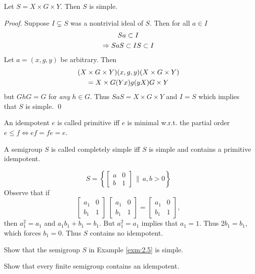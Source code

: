 \begin{proposition}  	\label{prop:2.1}
Let $S = X \times G \times Y$.  
Then $S$ is simple.
\end{proposition}

\begin{proof}  Suppose $I \subsetneq S$ was a nontrivial ideal of
$S$.  Then for all $a \in I$
\[
     \gathered
     Sa \subset I                                       \\
     \Rightarrow Sa S \subset IS \subset I
     \endgathered
\]
Let $a = (x,g,y)$ be arbitrary.  Then
\[
     \gathered
     (X \times G \times Y)(x,g,y)(X \times G \times Y)                  \\
     = X \times G(Yx)g(yX)G \times Y
     \endgathered
\]
but $GhG = G$ for {\it any} $h \in G$.  Thus $SaS = X \times G \times Y$ and
$I = S$ which implies that $S$ is simple.
\qed
\end{proof}

\begin{definition} 	\label{defn:2.4}
An idempotent $e$ is called primitive iff $e$ is minimal w.r.t. the partial order $e \le f \Leftrightarrow ef = fe = e$.
\end{definition}

\begin{definition} 	\label{defn:2.5}
A semigroup $S$ is called completely simple iff $S$ is simple and contains a primitive idempotent.
\end{definition}

\begin{example}		\label{exm:2.5}  
\[
     S = \left\{ \begin{bmatrix}  a &0 \\ b &1 \end{bmatrix}
          \,\bigg\|\, a,b > 0 \right\}                 
\]
Observe that if 
\[
        \begin{bmatrix}  a_1 &0 \\ b_1 &1 \end{bmatrix} \
        \begin{bmatrix} a_1 &0  \\ b_1 &1 \end{bmatrix} =
        \begin{bmatrix} a_1 &0  \\ b_1 &1 \end{bmatrix},    
\]
then $a^2_1 = a_1$ and $a_1b_1 + b_1 = b_1$.
But $a^2_1=a_1$ implies that $a_1=1$.
Thus $2b_1=b_1$, which forces $b_1 = 0$.
Thus $S$ contains no idempotent.
\end{example}

Show that the semigroup $S$ in Example \ref{exm:2.5} is simple.

Show that every finite semigroup contains an idempotent.
